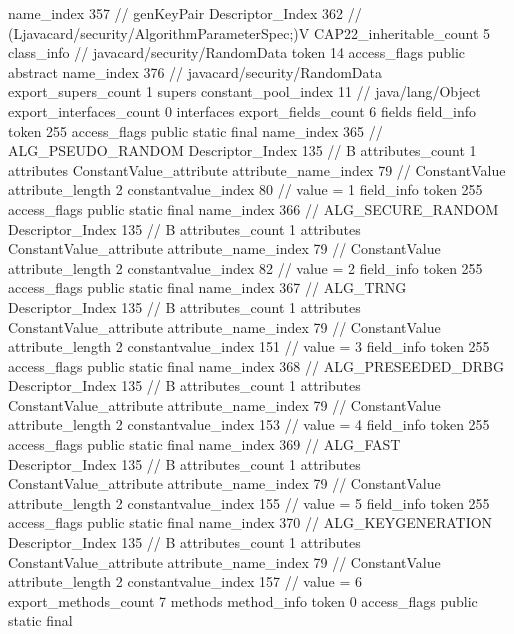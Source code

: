 {{{{{					name_index	357		// genKeyPair
					Descriptor_Index	362		// (Ljavacard/security/AlgorithmParameterSpec;)V
				}
			}
			CAP22_inheritable_count	5
		}
		class_info {		// javacard/security/RandomData
			token	14
			access_flags	public abstract
			name_index	376		// javacard/security/RandomData
			export_supers_count	1
			supers {
				constant_pool_index	11		// java/lang/Object
			}
			export_interfaces_count	0
			interfaces {
			}
			export_fields_count	6
			fields {
			field_info {
				token	255
				access_flags	public static final
				name_index	365		// ALG_PSEUDO_RANDOM
				Descriptor_Index	135		// B
				attributes_count	1
				attributes {
				ConstantValue_attribute {
					attribute_name_index	79		// ConstantValue
					attribute_length	2
					constantvalue_index	80		// value = 1
				}
				}
			}
			field_info {
				token	255
				access_flags	public static final
				name_index	366		// ALG_SECURE_RANDOM
				Descriptor_Index	135		// B
				attributes_count	1
				attributes {
				ConstantValue_attribute {
					attribute_name_index	79		// ConstantValue
					attribute_length	2
					constantvalue_index	82		// value = 2
				}
				}
			}
			field_info {
				token	255
				access_flags	public static final
				name_index	367		// ALG_TRNG
				Descriptor_Index	135		// B
				attributes_count	1
				attributes {
				ConstantValue_attribute {
					attribute_name_index	79		// ConstantValue
					attribute_length	2
					constantvalue_index	151		// value = 3
				}
				}
			}
			field_info {
				token	255
				access_flags	public static final
				name_index	368		// ALG_PRESEEDED_DRBG
				Descriptor_Index	135		// B
				attributes_count	1
				attributes {
				ConstantValue_attribute {
					attribute_name_index	79		// ConstantValue
					attribute_length	2
					constantvalue_index	153		// value = 4
				}
				}
			}
			field_info {
				token	255
				access_flags	public static final
				name_index	369		// ALG_FAST
				Descriptor_Index	135		// B
				attributes_count	1
				attributes {
				ConstantValue_attribute {
					attribute_name_index	79		// ConstantValue
					attribute_length	2
					constantvalue_index	155		// value = 5
				}
				}
			}
			field_info {
				token	255
				access_flags	public static final
				name_index	370		// ALG_KEYGENERATION
				Descriptor_Index	135		// B
				attributes_count	1
				attributes {
				ConstantValue_attribute {
					attribute_name_index	79		// ConstantValue
					attribute_length	2
					constantvalue_index	157		// value = 6
				}
				}
			}
			}
			export_methods_count	7
			methods {
				method_info {
					token	0
					access_flags	public static final
}}}}}
